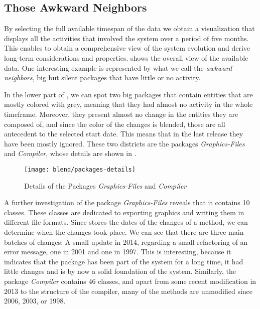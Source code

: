 \subsection{Those Awkward Neighbors}

By selecting the full available timespan of the data we obtain a visualization that displays all the activities that involved the \pha system over a period of five months.
This enables to obtain a comprehensive view of the system evolution and derive long-term considerations and properties.
 shows the overall view of the available data.
One interesting example is represented by what we call the \emph{awkward neighbors}, \ie big but silent packages that have little or no activity.

In the lower part of , we can spot two big packages that contain entities that are mostly colored with grey, meaning that they had almost no activity in the whole timeframe.
Moreover, they present almost no change in the entities they are composed of, and since the color of the changes is blended, those are all antecedent to the selected start date.
This means that in the last release they have been mostly ignored.
These two districts are the packages \textit{Graphics-Files} and \textit{Compiler}, whose details are shown in .

\begin{figure}[ht]
\centering
\texttt{[image: blend/packages-details]}
\caption{Details of the Packages \textit{Graphics-Files} and \textit{Compiler}}
\label{fig:packages-details}
\end{figure}

A further investigation of the package \textit{Graphics-Files} reveals that it contains 10 classes.
These classes are dedicated to exporting graphics and writing them in different file formats.
Since \pha stores the dates of the changes of a method, we can determine when the changes took place.
We can see that there are three main batches of changes: A small update in 2014, regarding a small refactoring of an error message, one in 2001 and one in 1997.
This is interesting, because it indicates that the package has been part of the system for a long time, it had little changes and is by now a solid foundation of the system.
Similarly, the package \textit{Compiler} contains 46 classes, and apart from some recent modification in 2013 to the structure of the compiler, many of the methods are unmodified since 2006, 2003, or 1998.

